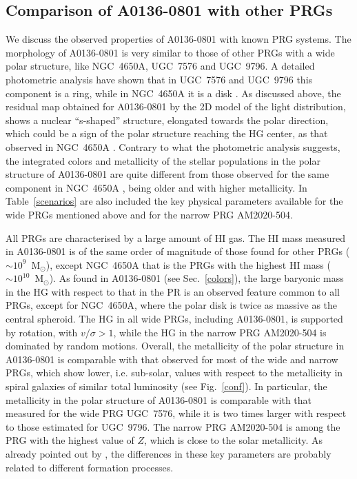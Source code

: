 \documentclass[useAMS,usenatbib]{mn2e}
\begin{document}
\subsection{Comparison of A0136-0801 with other PRGs}

We discuss the observed properties of A0136-0801 with known PRG
systems.  The morphology of A0136-0801 is very similar to those of
other PRGs with a wide polar structure, like NGC~4650A, UGC~7576 and
UGC~9796. A detailed photometric analysis have shown that in UGC~7576
and UGC~9796 \citep{Res97,Godinez07} this component is a ring, while
in NGC~4650A it is a disk \citep{Iod02}. As discussed above, the
residual map obtained for A0136-0801 by the 2D model of the light
distribution, shows a nuclear ``s-shaped'' structure, elongated
towards the polar direction, which could be a sign of the polar
structure reaching the HG center, as that observed in NGC~4650A
\citep{Iod02, Gal02}. Contrary to what the photometric analysis
suggests, the integrated colors and metallicity of the stellar
populations in the polar structure of A0136-0801 are quite different
from those observed for the same component in NGC~4650A \citep{Iod02,
  Spav10}, being older and with higher metallicity.  In
Table~\ref{scenarios} are also included the key physical parameters
available for the wide PRGs mentioned above and for the narrow PRG
AM2020-504.

All PRGs are characterised by a large amount of HI gas. The HI mass
measured in A0136-0801 is of the same order of magnitude of those
found for other PRGs ($\sim 10^{9}$~M$_{\odot}$), except NGC~4650A
that is the PRGs with the highest HI mass ($\sim
10^{10}$~M$_{\odot}$).  As found in A0136-0801 (see
Sec.~\ref{colors}), the large baryonic mass in the HG with respect to
that in the PR is an observed feature common to all PRGs, except for
NGC~4650A, where the polar disk is twice as massive as the central
spheroid. The HG in all wide PRGs, including A0136-0801, is supported
by rotation, with $v/ \sigma > 1$, while the HG in the narrow PRG
AM2020-504 is dominated by random motions.  Overall, the metallicity
of the polar structure in A0136-0801 is comparable with that observed
for most of the wide and narrow PRGs, which show lower,
i.e. sub-solar, values with respect to the metallicity in spiral
galaxies of similar total luminosity (see Fig.~\ref{conf}). In
particular, the metallicity in the polar structure of A0136-0801 is
comparable with that measured for the wide PRG UGC~7576, while it is
two times larger with respect to those estimated for UGC~9796. The
narrow PRG AM2020-504 is among the PRG with the highest value of $Z$,
which is close to the solar metallicity.  As already pointed out by
\citet{Iod2014}, the differences in these key parameters are probably
related to different formation processes.
\end{document}
